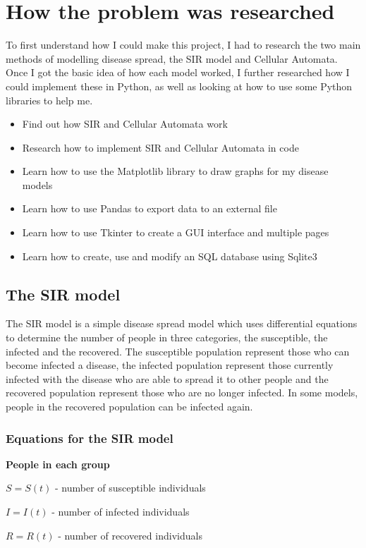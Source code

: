 \documentclass[11pt, a4paper]{article}
\begin{document}
\section{How the problem was researched}
To first understand how I could make this project, I had to research the two main methods of modelling disease spread, the SIR model and Cellular Automata. Once I got the basic idea of how each model worked, I further researched how I could implement these in Python, as well as looking at how to use some Python libraries to help me.
\begin{itemize}
    \item Find out how SIR and Cellular Automata work
    \item Research how to implement SIR and Cellular Automata in code
    \item Learn how to use the Matplotlib library to draw graphs for my disease models
    \item Learn how to use Pandas to export data to an external file
    \item Learn how to use Tkinter to create a GUI interface and multiple pages
    \item Learn how to create, use and modify an SQL database using Sqlite3
\end{itemize}
\subsection{The SIR model}
The SIR model is a simple disease spread model which uses differential equations to determine the number of people in three categories, the susceptible, the infected and the recovered. The susceptible population represent those who can become infected a disease, the infected population represent those currently infected with the disease who are able to spread it to other people and the recovered population represent those who are no longer infected. In some models, people in the recovered population can be infected again.
\subsubsection{Equations for the SIR model}

\textbf{People in each group}

\(S = S(t) \) - number of susceptible individuals

\(I = I(t) \) - number of infected individuals

\(R = R(t) \) - number of recovered individuals
\end{document}
